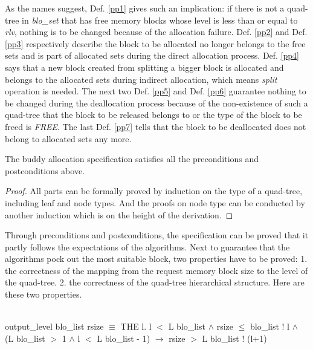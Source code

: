 As the names suggest, Def. \ref{pp1} gives such an implication: if there is not a quad-tree in \emph{blo\_set} that has free memory blocks whose level is less than or equal to \emph{rlv}, nothing is to be changed because of the allocation failure. Def. \ref{pp2} and Def. \ref{pp3} respectively describe the block to be allocated no longer belongs to the free sets and is part of allocated sets during the direct allocation process. Def. \ref{pp4} says that a new block created from splitting a bigger block is allocated and belongs to the allocated sets during indirect allocation, which means \emph{split} operation is needed. The next two Def. \ref{pp5} and Def. \ref{pp6} guarantee nothing to be changed during the deallocation process because of the non-existence of such a quad-tree that the block to be released belongs to or the type of the block to be freed is \emph{FREE}. The last Def. \ref{pp7} tells that the block to be deallocated does not belong to allocated sets any more.

\begin{theorem}
The buddy allocation specification satisfies all the preconditions and postconditions above.
\end{theorem}

\begin{proof}
All parts can be formally proved by induction on the type of a quad-tree, including leaf and node types. And the proofs on node type can be conducted by another induction which is on the height of the derivation.
\end{proof}

Through preconditions and postconditions, the specification can be proved that it partly follows the expectations of the algorithms. Next to guarantee that the algorithms pock out the most suitable block, two properties have to be proved: 1. the correctness of the mapping from the request memory block size to the level of the quad-tree. 2. the correctness of the quad-tree hierarchical  structure. Here are these two properties.

\begin{definition}  \\
output\_level blo\_list rsize $\equiv$ THE l. l $<$ L blo\_list $\wedge$ rsize $\le$ blo\_list ! l $\wedge$ \\
\phantom{x} \hspace{10pt} (L blo\_list $>$ 1 $\wedge$ l $<$ L blo\_list - 1) $\longrightarrow$ rsize $>$ L blo\_list ! (l+1)
\end{definition}

